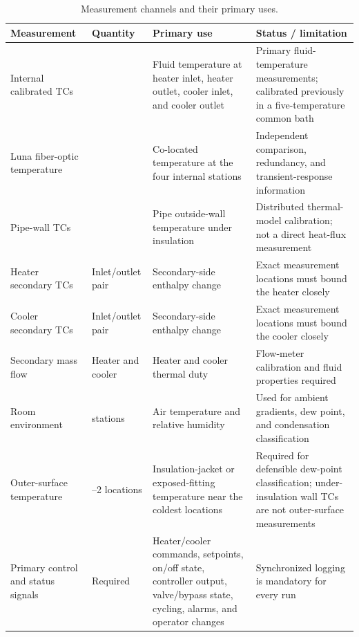\documentclass[11pt]{article}
\renewcommand{\arraystretch}{1.18}
\begin{document}
\begin{table}[H]
\centering
\caption{Measurement channels and their primary uses.}
\label{tab:channels}
{\small\renewcommand{\arraystretch}{1.13}
\begin{tabularx}{\textwidth}{@{}>{\raggedright\arraybackslash}p{1.30in}>{\centering\arraybackslash}p{0.72in}>{\raggedright\arraybackslash}X>{\raggedright\arraybackslash}X@{}}
\toprule
\textbf{Measurement} & \textbf{Quantity} & \textbf{Primary use} & \textbf{Status / limitation} \\
\midrule
Internal calibrated TCs & 4 & Fluid temperature at heater inlet, heater outlet, cooler inlet, and cooler outlet & Primary fluid-temperature measurements; calibrated previously in a five-temperature common bath \\
Luna fiber-optic temperature & 4 & Co-located temperature at the four internal stations & Independent comparison, redundancy, and transient-response information \\
Pipe-wall TCs & 12 & Pipe outside-wall temperature under insulation & Distributed thermal-model calibration; not a direct heat-flux measurement \\
Heater secondary TCs & Inlet/outlet pair & Secondary-side enthalpy change & Exact measurement locations must bound the heater closely \\
Cooler secondary TCs & Inlet/outlet pair & Secondary-side enthalpy change & Exact measurement locations must bound the cooler closely \\
Secondary mass flow & Heater and cooler & Heater and cooler thermal duty & Flow-meter calibration and fluid properties required \\
Room environment & 2 stations & Air temperature and relative humidity & Used for ambient gradients, dew point, and condensation classification \\
Outer-surface temperature & 1--2 locations & Insulation-jacket or exposed-fitting temperature near the coldest locations & Required for defensible dew-point classification; under-insulation wall TCs are not outer-surface measurements \\
Primary control and status signals & Required & Heater/cooler commands, setpoints, on/off state, controller output, valve/bypass state, cycling, alarms, and operator changes & Synchronized logging is mandatory for every run \\
\bottomrule
\end{tabularx}}
\end{table}
\end{document}
